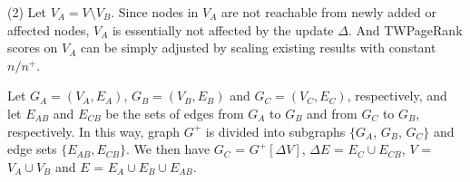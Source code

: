 \sstab(2) Let $V_A = V\setminus V_B$. Since nodes in $V_A$ are not reachable from newly added or affected nodes, $V_A$ is essentially not affected by the update $\Delta$. And TWPageRank scores on $V_A$ can be simply adjusted by scaling existing results with constant ${n}/{n^+}$.

Let $G_A=(V_A,E_A)$, $G_B=(V_B,E_B)$ and $G_C=(V_C,E_C)$, respectively, and
let $E_{AB}$ and $E_{CB}$  be the sets of edges from $G_A$ to $G_B$ and from $G_C$ to $G_B$, respectively.
In this way, graph $G^+$ is divided into subgraphs $\{G_A$, $G_B$, $G_C\}$ and edge sets $\{E_{AB}, E_{CB}\}$.
%
We then have $G_C$ = $G^+[\Delta V]$, $\Delta E$ = $E_C\cup E_{CB}$, $V$ = $V_A\cup V_B$ and $E$ = $E_A\cup E_B\cup E_{AB}$.



\begin{figure}[tb!]
\begin{center}
{\small
\begin{minipage}{3.36in}
\myhrule \vspace{-1.5ex}
\end{minipage}}
\end{center}
\end{figure}
